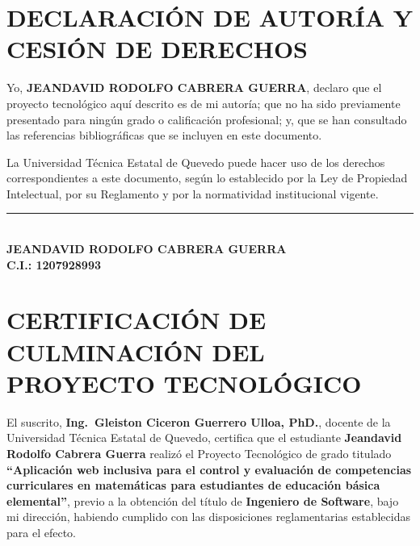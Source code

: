\documentclass[12pt,a4paper,oneside]{report}
\begin{document}
\thispagestyle{empty}
\mbox{}
\clearpage

\setcounter{page}{2}

\chapter*{DECLARACIÓN DE AUTORÍA Y CESIÓN DE DERECHOS}

\vspace{1cm}

Yo, \textbf{JEANDAVID RODOLFO CABRERA GUERRA}, declaro que el proyecto tecnológico aquí descrito es de mi autoría; que no ha sido previamente presentado para ningún grado o calificación profesional; y, que se han consultado las referencias bibliográficas que se incluyen en este documento.

La Universidad Técnica Estatal de Quevedo puede hacer uso de los derechos correspondientes a este documento, según lo establecido por la Ley de Propiedad Intelectual, por su Reglamento y por la normatividad institucional vigente.

\vspace{3cm}

\begin{center}
\rule{8cm}{0.5pt}\\[0.3cm]
\textbf{JEANDAVID RODOLFO CABRERA GUERRA}\\
\textbf{C.I.: 1207928993}
\end{center}

\clearpage

\chapter*{CERTIFICACIÓN DE CULMINACIÓN DEL PROYECTO TECNOLÓGICO}

\vspace{1cm}

El suscrito, \textbf{Ing.\ Gleiston Ciceron Guerrero Ulloa, PhD.}, docente de la Universidad Técnica Estatal de Quevedo, certifica que el estudiante \textbf{Jeandavid Rodolfo Cabrera Guerra} realizó el Proyecto Tecnológico de grado titulado \textbf{``Aplicación web inclusiva para el control y evaluación de competencias curriculares en matemáticas para estudiantes de educación básica elemental''}, previo a la obtención del título de \textbf{Ingeniero de Software}, bajo mi dirección, habiendo cumplido con las disposiciones reglamentarias establecidas para el efecto.
\end{document}
